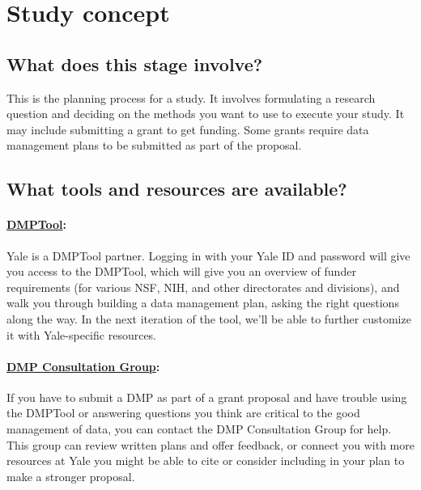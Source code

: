\documentclass[]{article}
\begin{document}
\section{Study concept}\label{study-concept}

\subsection{What does this stage
involve?}\label{what-does-this-stage-involve}

This is the planning process for a study. It involves formulating a
research question and deciding on the methods you want to use to execute
your study. It may include submitting a grant to get funding. Some
grants require data management plans to be submitted as part of the
proposal.

\subsection{What tools and resources are
available?}\label{what-tools-and-resources-are-available}

\paragraph{\href{https://dmp.cdlib.org/}{DMPTool}:}\label{dmptool}

Yale is a DMPTool partner. Logging in with your Yale ID and password
will give you access to the DMPTool, which will give you an overview of
funder requirements (for various NSF, NIH, and other directorates and
divisions), and walk you through building a data management plan, asking
the right questions along the way. In the next iteration of the tool,
we'll be able to further customize it with Yale-specific resources.

\paragraph{\href{http://csssi.yale.edu/dmp}{DMP Consultation
Group}:}\label{dmp-consultation-group}

If you have to submit a DMP as part of a grant proposal and have trouble
using the DMPTool or answering questions you think are critical to the
good management of data, you can contact the DMP Consultation Group for
help. This group can review written plans and offer feedback, or connect
you with more resources at Yale you might be able to cite or consider
including in your plan to make a stronger proposal.
\end{document}
